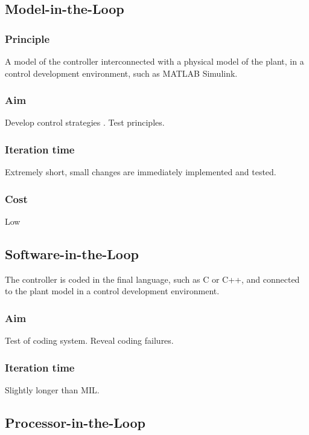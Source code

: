 \documentclass[a4paper,twoside,english]{report}
\begin{document}
\subsection{Model-in-the-Loop}

\subsubsection{Principle}

A model of the controller interconnected with a physical model of
the plant, in a control development environment, such as MATLAB Simulink.

\subsubsection{Aim}

Develop control strategies . Test principles.

\subsubsection{Iteration time}

Extremely short, small changes are immediately implemented and tested.

\subsubsection{Cost}

Low

\subsection{Software-in-the-Loop}

The controller is coded in the final language, such as C or C++, and
connected to the plant model in a control development environment.

\subsubsection{Aim}

Test of coding system. Reveal coding failures.

\subsubsection{Iteration time}

Slightly longer than MIL.

\subsection{Processor-in-the-Loop}
\end{document}
